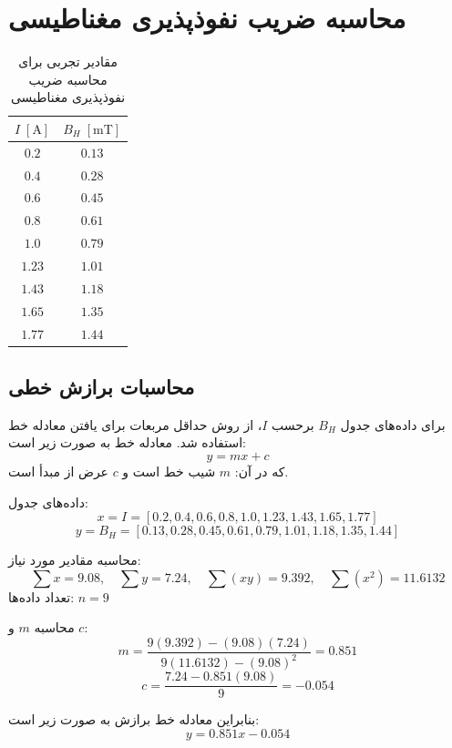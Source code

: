 \documentclass[a4paper, 11pt]{article}
\begin{document}
\section{محاسبه ضریب نفوذپذیری مغناطیسی}


\begin{table}[h!]
\caption{مقادیر تجربی برای محاسبه ضریب نفوذپذیری مغناطیسی}
\centering
\begin{tabular}{cc}
\hline
$I \;[\mathrm{A}]$ & $B_H \;[\mathrm{mT}]$ \\
\hline
 $0.2$ & $0.13$ \\
 $0.4$ & $0.28$ \\
 $0.6$ & $0.45$ \\
 $0.8$ & $0.61$ \\
 $1.0$ & $0.79$ \\
$1.23$ & $1.01$ \\
$1.43$ & $1.18$ \\
$1.65$ & $1.35$ \\
$1.77$ & $1.44$ \\
\hline
\end{tabular}
\end{table}

\subsection{محاسبات برازش خطی}
برای داده‌های جدول $B_H$ برحسب $I$، از روش حداقل مربعات برای یافتن معادله خط استفاده شد. معادله خط به صورت زیر است:
$$
y = mx + c
$$
که در آن:
 $m$ شیب خط است و
 $c$ عرض از مبدأ است.

داده‌های جدول:
$$
x = I = [0.2, 0.4, 0.6, 0.8, 1.0, 1.23, 1.43, 1.65, 1.77]
$$
$$
y = B_H = [0.13, 0.28, 0.45, 0.61, 0.79, 1.01, 1.18, 1.35, 1.44]
$$

محاسبه مقادیر مورد نیاز:
$$
\sum x = 9.08, \quad \sum y = 7.24, \quad \sum(xy) = 9.392, \quad \sum(x^2) = 11.6132
$$
تعداد داده‌ها: $n = 9$

محاسبه $m$ و $c$:
$$
m = \frac{9(9.392) - (9.08)(7.24)}{9(11.6132) - (9.08)^2} = 0.851
$$
$$
c = \frac{7.24 - 0.851(9.08)}{9} = -0.054
$$

بنابراین معادله خط برازش به صورت زیر است:
$$
y = 0.851x - 0.054
$$
\end{document}
